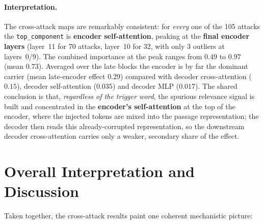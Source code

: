 \documentclass[11pt]{article}
\begin{document}
\paragraph{Interpretation.} The cross-attack maps are remarkably consistent:
for \emph{every} one of the 105 attacks the \texttt{top\_component} is
\textbf{encoder self-attention}, peaking at the \textbf{final encoder layers}
(layer~11 for 70 attacks, layer~10 for 32, with only 3 outliers at layers~0/9).
The combined importance at the peak ranges from $0.49$ to $0.97$ (mean $0.73$).
Averaged over the late blocks the encoder is by far the dominant carrier
(mean late-encoder effect $0.29$) compared with decoder cross-attention
($0.15$), decoder self-attention ($0.035$) and decoder MLP ($0.017$). The
shared conclusion is that, \emph{regardless of the trigger word}, the spurious
relevance signal is built and concentrated in the \textbf{encoder's
self-attention} at the top of the encoder, where the injected tokens are mixed
into the passage representation; the decoder then reads this already-corrupted
representation, so the downstream decoder cross-attention carries only a weaker,
secondary share of the effect.

\section{Overall Interpretation and Discussion}

Taken together, the cross-attack results paint one coherent
mechanistic picture:
\end{document}

